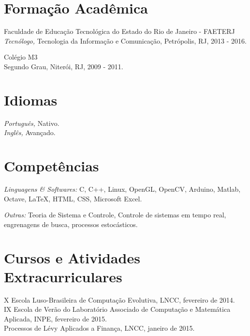 \documentclass[margin, 10pt]{res} %
\begin{document}
\begin{resume}
\section{Formação Acadêmica}
Faculdade de Educação Tecnológica do Estado do Rio de Janeiro - FAETERJ \\
{\sl Tecnólogo,} Tecnologia da Informação e Comunicação, Petrópolis, RJ, 2013 - 2016.

Colégio M3 \\
Segundo Grau, Niterói, RJ, 2009 - 2011.
 

\section{Idiomas}
{\sl Português,} Nativo.\\
{\sl Inglês,} Avançado.


\section{Competências} 
{\sl Linguagens \& Softwares:} C, C++, Linux, OpenGL, OpenCV, Arduino, Matlab, Octave, LaTeX, HTML, CSS, Microsoft Excel.

{\sl Outras:} Teoria de Sistema e Controle, Controle de sistemas em tempo real, engrenagens de busca, processos estocásticos.
 

\section{Cursos e Atividades Extracurriculares} 
X Escola Luso-Brasileira de Computação Evolutiva, LNCC, fevereiro de 2014.\\
IX Escola de Verão do Laboratório Associado de Computação e Matemática Aplicada, INPE, fevereiro de 2015.\\
Processos de Lévy Aplicados a Finança, LNCC, janeiro de 2015.\\


\end{resume}
\end{document}
